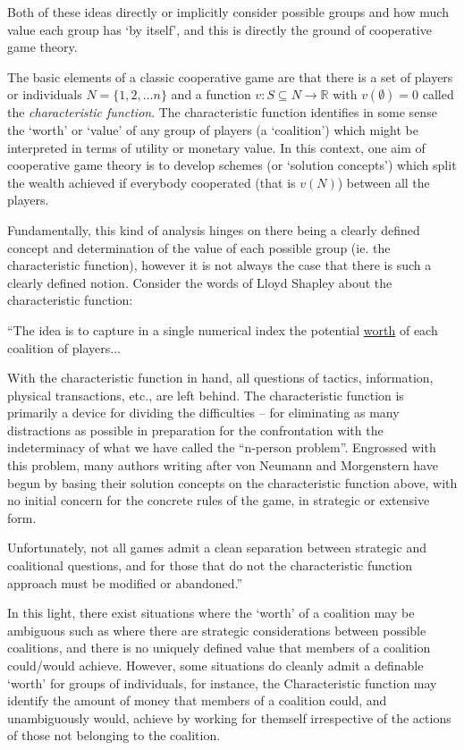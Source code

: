 Both of these ideas directly or implicitly consider possible groups and how much value each group has `by itself', and this is directly the ground of cooperative game theory.

The basic elements of a classic cooperative game are that there is a set of players or individuals $N=\{1,2,\dots n\}$ and a function $v: S\subseteq N \rightarrow \mathbb{R}$ with $v(\emptyset)=0$ called the \textit{characteristic function}.
The characteristic function identifies in some sense the `worth' or `value' of any group of players (a `coalition') which might be interpreted in terms of utility or monetary value.
In this context, one aim of cooperative game theory is to develop schemes (or `solution concepts') which split the wealth achieved if everybody cooperated (that is $v(N)$) between all the players.

Fundamentally, this kind of analysis hinges on there being a clearly defined concept and determination of the value of each possible group (ie. the characteristic function), however it is not always the case that there is such a clearly defined notion.
Consider the words of Lloyd Shapley about the characteristic function:

\begin{displayquote}
``The idea is to capture in a single numerical index the potential \underline{worth} of each coalition of players...

With the characteristic function in hand, all questions of tactics, information, physical transactions, etc., are left behind. The characteristic function is primarily a device for dividing the difficulties -- for eliminating as many distractions as possible in preparation for the confrontation with the indeterminacy of what we have called the ``n-person problem''. Engrossed with this problem, many authors writing after von Neumann and Morgenstern have begun by basing their solution concepts on the characteristic function above, with no initial concern for the concrete rules of the game, in strategic or extensive form.

Unfortunately, not all games admit a clean separation between strategic and coalitional questions, and for those that do not the characteristic function approach must be modified or abandoned.''\\
\citep{ShapleySchubikCharacteristicFunction}
\end{displayquote}

In this light, there exist situations where the `worth' of a coalition may be ambiguous such as where there are strategic considerations between possible coalitions, and there is no uniquely defined value that members of a coalition could/would achieve.
However, some situations do cleanly admit a definable `worth' for groups of individuals, for instance, the Characteristic function may identify the amount of money that members of a coalition could, and unambiguously would, achieve by working for themself irrespective of the actions of those not belonging to the coalition.

